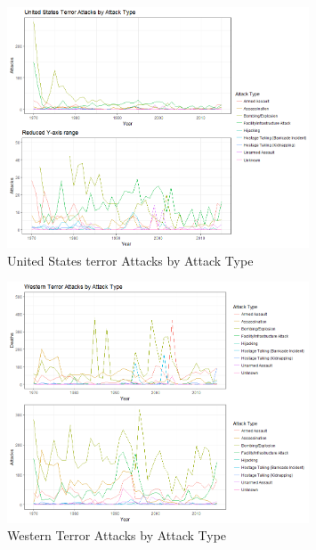 \documentclass[10pt,a4paper]{article}
\begin{document}
\begin{center}
\begin{figure}[h!]
		
	\includegraphics[width=0.8\textwidth]{Plots/AttackType/Attacks.png}
	\caption{United States terror Attacks by Attack Type}

\end{figure}

\begin{figure}[h!]
		
	\includegraphics[width=0.8\textwidth]{Plots/AttackType/AttackTypeWesternCountries.png}
	\caption{Western Terror Attacks by Attack Type}

\end{figure}

\begin{figure}[h!]


\end{figure}
\end{center}
\end{document}

